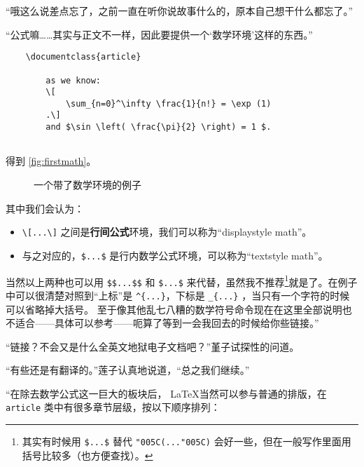 “哦这么说差点忘了，之前一直在听你说故事什么的，原本自己想干什么都忘了。”

“公式嘛……其实与正文不一样，因此要提供一个‘数学环境’这样的东西。”


\begin{lstlisting}
    \documentclass{article}
    
        as we know:
        \[
            \sum_{n=0}^\infty \frac{1}{n!} = \exp (1)
        .\]
        and $\sin \left( \frac{\pi}{2} \right) = 1 $.
    
\end{lstlisting}

得到 \autoref{fig:firstmath}。

\begin{figure}[th]
    \centering
    \caption{一个带了数学环境的例子}
    \label{fig:firstmath}
\end{figure}


其中我们会认为：
\begin{itemize}
    \item \verb"\[...\]" 之间是\textbf{行间公式}环境，我们可以称为``displaystyle math''。
    \item 与之对应的，\verb"$...$" 是行内数学公式环境，可以称为``textstyle math''。
\end{itemize}

当然以上两种也可以用 \verb"$$...$$" 和 \verb"$...$" 来代替，虽然我不推荐\footnote{其实有时候用 \texttt{\$...\$} 替代 \texttt{\char"005C(...\char"005C)} 会好一些，但在一般写作里面用括号比较多（也方便查找）。}就是了。在例子中可以很清楚对照到“上标”是 \verb"^{...}"，下标是 \verb"_{...}" ，当只有一个字符的时候可以省略掉大括号。 至于像其他乱七八糟的数学符号命令现在在这里全部说明也不适合——具体可以参考——呃算了等到一会我回去的时候给你些链接。”

“链接？不会又是什么全英文地狱电子文档吧？”堇子试探性的问道。

“有些还是有翻译的。”莲子认真地说道，“总之我们继续。”

“在除去数学公式这一巨大的板块后， \LaTeX 当然可以参与普通的排版，在 \verb"article" 类中有很多章节层级，按以下顺序排列：

